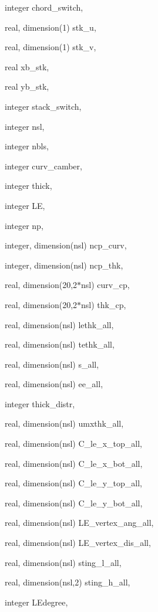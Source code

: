 {\begin{DoxyParamCaption}
\item[{integer}]{chord\+\_\+switch, }
\item[{real, dimension(1)}]{stk\+\_\+u, }
\item[{real, dimension(1)}]{stk\+\_\+v, }
\item[{real}]{xb\+\_\+stk, }
\item[{real}]{yb\+\_\+stk, }
\item[{integer}]{stack\+\_\+switch, }
\item[{integer}]{nsl, }
\item[{integer}]{nbls, }
\item[{integer}]{curv\+\_\+camber, }
\item[{integer}]{thick, }
\item[{integer}]{L\+E, }
\item[{integer}]{np, }
\item[{integer, dimension(nsl)}]{ncp\+\_\+curv, }
\item[{integer, dimension(nsl)}]{ncp\+\_\+thk, }
\item[{real, dimension(20,2$\ast$nsl)}]{curv\+\_\+cp, }
\item[{real, dimension(20,2$\ast$nsl)}]{thk\+\_\+cp, }
\item[{real, dimension(nsl)}]{lethk\+\_\+all, }
\item[{real, dimension(nsl)}]{tethk\+\_\+all, }
\item[{real, dimension(nsl)}]{s\+\_\+all, }
\item[{real, dimension(nsl)}]{ee\+\_\+all, }
\item[{integer}]{thick\+\_\+distr, }
\item[{real, dimension(nsl)}]{umxthk\+\_\+all, }
\item[{real, dimension(nsl)}]{C\+\_\+le\+\_\+x\+\_\+top\+\_\+all, }
\item[{real, dimension(nsl)}]{C\+\_\+le\+\_\+x\+\_\+bot\+\_\+all, }
\item[{real, dimension(nsl)}]{C\+\_\+le\+\_\+y\+\_\+top\+\_\+all, }
\item[{real, dimension(nsl)}]{C\+\_\+le\+\_\+y\+\_\+bot\+\_\+all, }
\item[{real, dimension(nsl)}]{L\+E\+\_\+vertex\+\_\+ang\+\_\+all, }
\item[{real, dimension(nsl)}]{L\+E\+\_\+vertex\+\_\+dis\+\_\+all, }
\item[{real, dimension(nsl)}]{sting\+\_\+l\+\_\+all, }
\item[{real, dimension(nsl,2)}]{sting\+\_\+h\+\_\+all, }
\item[{integer}]{L\+Edegree, }

\end{DoxyParamCaption}}
